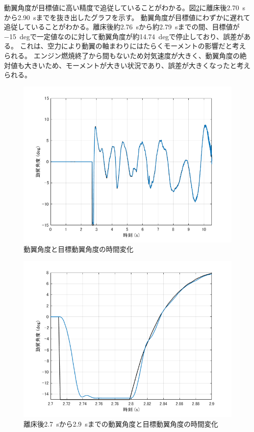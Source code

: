 \documentclass[a4paper,11pt,uplatex]{jsarticle}
\begin{document}
動翼角度が目標値に高い精度で追従していることがわかる。図\ref{fig:動翼角度_切り取り}に離床後\SI{2.70}{s}から\SI{2.90}{s}までを抜き出したグラフを示す。
動翼角度が目標値にわずかに遅れて追従していることがわかる。離床後約\SI{2.76}{s}から約\SI{2.79}{s}までの間、目標値が\SI{-15}{deg}で一定値なのに対して動翼角度が約\SI{14.74}{deg}で停止しており、誤差がある。
これは、空力により動翼の軸まわりにはたらくモーメントの影響だと考えられる。
エンジン燃焼終了から間もないため対気速度が大きく、動翼角度の絶対値も大きいため、モーメントが大きい状況であり、誤差が大きくなったと考えられる。
\begin{figure}[H]
	\centering
	\includegraphics[width=0.8\linewidth]{pic_avi/動翼角度.png}
	\caption{動翼角度と目標動翼角度の時間変化}
	\label{fig:動翼角度}
\end{figure}
\begin{figure}[H]
	\centering
	\includegraphics[width=0.8\linewidth]{pic_avi/動翼角度_切り取り.png}
	\caption{離床後\SI{2.7}{s}から\SI{2.9}{s}までの動翼角度と目標動翼角度の時間変化}
	\label{fig:動翼角度_切り取り}
\end{figure}
\end{document}
